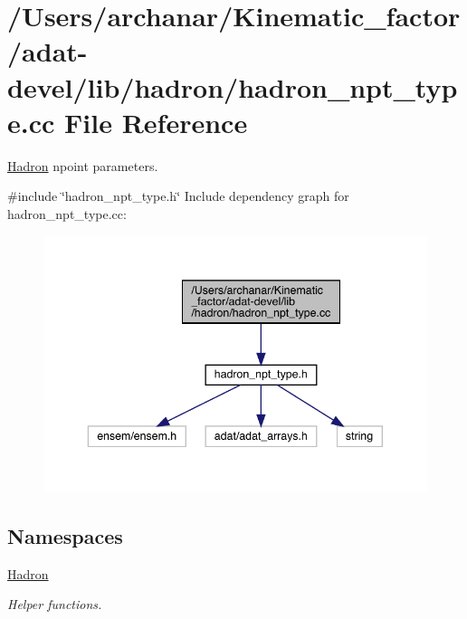 \hypertarget{adat-devel_2lib_2hadron_2hadron__npt__type_8cc}{}\section{/\+Users/archanar/\+Kinematic\+\_\+factor/adat-\/devel/lib/hadron/hadron\+\_\+npt\+\_\+type.cc File Reference}
\label{adat-devel_2lib_2hadron_2hadron__npt__type_8cc}


\mbox{\hyperlink{namespaceHadron}{Hadron}} npoint parameters.  


{\ttfamily \#include \char`\"{}hadron\+\_\+npt\+\_\+type.\+h\char`\"{}}\newline
Include dependency graph for hadron\+\_\+npt\+\_\+type.\+cc\+:
\nopagebreak
\begin{figure}[H]
\begin{center}
\leavevmode
\includegraphics[width=343pt]{df/d19/adat-devel_2lib_2hadron_2hadron__npt__type_8cc__incl}
\end{center}
\end{figure}
\subsection*{Namespaces}
\begin{DoxyCompactItemize}
\item 
 \mbox{\hyperlink{namespaceHadron}{Hadron}}
\begin{DoxyCompactList}\small\item\em Helper functions. \end{DoxyCompactList}\end{DoxyCompactItemize}
